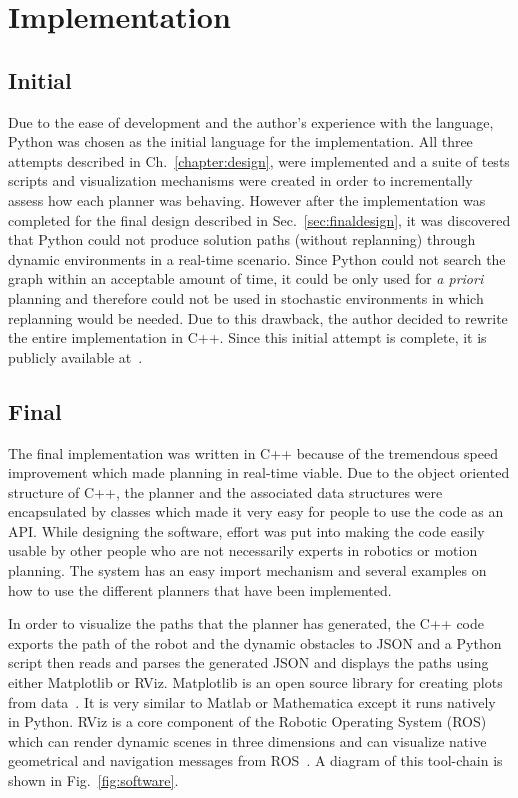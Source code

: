 


\chapter{Implementation}

\label{chapter:Implementation}

\section{Initial}

Due to the ease of development and the author's experience with the language,
Python was chosen as the initial language for the implementation. All three
attempts described in Ch.~\ref{chapter:design}, were implemented and a suite of
tests scripts and visualization mechanisms were created in order to
incrementally assess how each planner was behaving. However after the
implementation was completed for the final design described in
Sec.~\ref{sec:finaldesign}, it was discovered that Python could not produce
solution paths (without replanning) through dynamic environments in a real-time
scenario. Since Python could not search the graph within an acceptable amount
of time, it could be only used for \emph{a priori} planning and therefore could
not be used in stochastic environments in which replanning would be needed. Due
to this drawback, the author decided to rewrite the entire implementation in
C++. Since this initial attempt is complete, it is publicly available
at~\cite{racer}.

\section{Final}

The final implementation was written in C++ because of the tremendous speed
improvement which made planning in real-time viable. Due to the object oriented
structure of C++, the planner and the associated data structures were
encapsulated by classes which made it very easy for people to use the code as
an API. While designing the software, effort was put into making the code
easily usable by other people who are not necessarily experts in robotics or
motion planning. The system has an easy import mechanism and several examples
on how to use the different planners that have been implemented.

In order to visualize the paths that the planner has generated, the C++ code
exports the path of the robot and the dynamic obstacles to JSON and a Python
script then reads and parses the generated JSON and displays the paths using
either Matplotlib or RViz. Matplotlib is an open source library for creating
plots from data~\cite{matplotlib}. It is very similar to Matlab or Mathematica
except it runs natively in Python. RViz is a core component of the Robotic
Operating System (ROS) which can render dynamic scenes in three dimensions and
can visualize native geometrical and navigation messages from ROS~\cite{ros}. A
diagram of this tool-chain is shown in Fig.~\ref{fig:software}.

